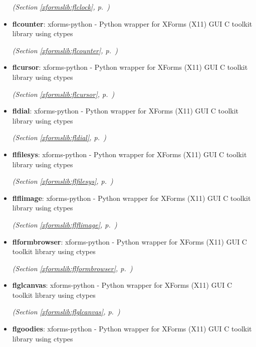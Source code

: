 \begin{itemize}
  \textit{(Section \ref{xformslib:flclock}, p.~\pageref{xformslib:flclock})}

\item \textbf{flcounter}: xforms-python - Python wrapper for XForms (X11) GUI C toolkit library using
ctypes



  \textit{(Section \ref{xformslib:flcounter}, p.~\pageref{xformslib:flcounter})}

\item \textbf{flcursor}: xforms-python - Python wrapper for XForms (X11) GUI C toolkit library using
ctypes



  \textit{(Section \ref{xformslib:flcursor}, p.~\pageref{xformslib:flcursor})}

\item \textbf{fldial}: xforms-python - Python wrapper for XForms (X11) GUI C toolkit library using
ctypes



  \textit{(Section \ref{xformslib:fldial}, p.~\pageref{xformslib:fldial})}

\item \textbf{flfilesys}: xforms-python - Python wrapper for XForms (X11) GUI C toolkit library using
ctypes



  \textit{(Section \ref{xformslib:flfilesys}, p.~\pageref{xformslib:flfilesys})}

\item \textbf{flflimage}: xforms-python - Python wrapper for XForms (X11) GUI C toolkit library using
ctypes



  \textit{(Section \ref{xformslib:flflimage}, p.~\pageref{xformslib:flflimage})}

\item \textbf{flformbrowser}: xforms-python - Python wrapper for XForms (X11) GUI C toolkit library using
ctypes



  \textit{(Section \ref{xformslib:flformbrowser}, p.~\pageref{xformslib:flformbrowser})}

\item \textbf{flglcanvas}: xforms-python - Python wrapper for XForms (X11) GUI C toolkit library using
ctypes



  \textit{(Section \ref{xformslib:flglcanvas}, p.~\pageref{xformslib:flglcanvas})}

\item \textbf{flgoodies}: xforms-python - Python wrapper for XForms (X11) GUI C toolkit library using
ctypes




\end{itemize}
